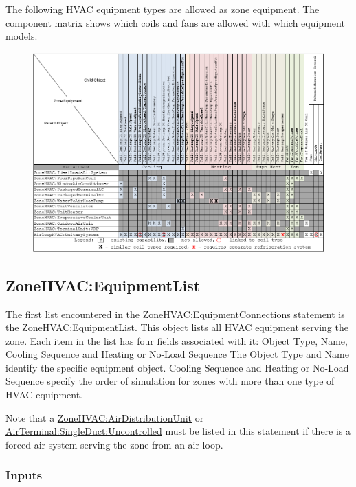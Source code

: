 The following HVAC equipment types are allowed as zone equipment. The component matrix shows which coils and fans are allowed with which equipment models.

\begin{figure}[htbp]
\centering
\includegraphics{media/ZoneComponentMatrix.png}
\caption{}
\end{figure}

\subsection{ZoneHVAC:EquipmentList}\label{zonehvacequipmentlist}

The first list encountered in the \hyperref[zonehvacequipmentconnections]{ZoneHVAC:EquipmentConnections} statement is the ZoneHVAC:EquipmentList. This object lists all HVAC equipment serving the zone. Each item in the list has four fields associated with it: Object Type, Name, Cooling Sequence and Heating or No-Load Sequence The Object Type and Name identify the specific equipment object. Cooling Sequence and Heating or No-Load Sequence specify the order of simulation for zones with more than one type of HVAC equipment.

Note that a \hyperref[zonehvacairdistributionunit]{ZoneHVAC:AirDistributionUnit} or \hyperref[airterminalsingleductuncontrolled]{AirTerminal:SingleDuct:Uncontrolled} must be listed in this statement if there is a forced air system serving the zone from an air loop.

\subsubsection{Inputs}\label{inputs-2-048}

